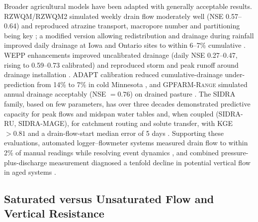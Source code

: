 Broader agricultural models have been adapted with generally acceptable results. \textsc{RZWQM}/\textsc{RZWQM2} simulated weekly drain flow moderately well (NSE 0.57--0.64) and reproduced atrazine transport, macropore number and partitioning being key \parencite{Malone2014,Singh1996}; a modified version allowing redistribution and drainage during rainfall improved daily drainage at Iowa and Ontario sites to within 6--7\% cumulative \parencite{Xian2017}. \textsc{WEPP} enhancements improved uncalibrated drainage (daily NSE 0.27--0.47, rising to 0.59--0.73 calibrated) and reproduced storm and peak runoff around drainage installation \parencite{RevueltaAcosta2021,SAVABI1993}. \textsc{ADAPT} calibration reduced cumulative-drainage under-prediction from 14\% to 7\% in cold Minnesota \parencite{Mendez2004}, and \textsc{GPFARM-Range} simulated annual drainage acceptably (NSE $=0.76$) on drained pasture \parencite{Chen2016}. The \textsc{SIDRA} family, based on few parameters, has over three decades demonstrated predictive capacity for peak flows and midspan water tables and, when coupled (\textsc{SIDRA-RU}, \textsc{SIDRA-MAGE}), for catchment routing and solute transfer, with KGE $>0.81$ and a drain-flow-start median error of 5 days \parencite{Zimmer2023,Henine2022,LESAFFRE1988,Giraud1997}. Supporting these evaluations, automated logger--flowmeter systems measured drain flow to within 2\% of manual readings while resolving event dynamics \parencite{Kanwar1999}, and combined pressure-plus-discharge measurement diagnosed a tenfold decline in potential vertical flow in aged systems \parencite{Nishida2020,Gurklys2008}.

\subsection{Saturated versus Unsaturated Flow and Vertical Resistance}

